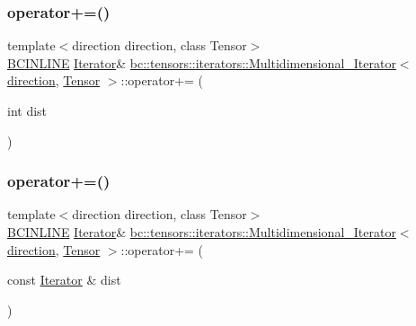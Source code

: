 \subsubsection{\texorpdfstring{operator+=()}{operator+=()}\hspace{0.1cm}{\footnotesize\ttfamily [1/2]}}
{\footnotesize\ttfamily template$<$direction direction, class Tensor$>$ \\
\hyperlink{common_8h_a6699e8b0449da5c0fafb878e59c1d4b1}{B\+C\+I\+N\+L\+I\+NE} \hyperlink{structbc_1_1tensors_1_1iterators_1_1Multidimensional__Iterator_a12d78eb95b3b0fbee7c824f0a79c1513}{Iterator}\& \hyperlink{structbc_1_1tensors_1_1iterators_1_1Multidimensional__Iterator}{bc\+::tensors\+::iterators\+::\+Multidimensional\+\_\+\+Iterator}$<$ \hyperlink{namespacebc_1_1tensors_1_1iterators_ae76efe63fb9cb4985d5e4e6af0ebf296}{direction}, \hyperlink{namespacebc_a659391e47ab612be3ba6c18cf9c89159}{Tensor} $>$\+::operator+= (\begin{DoxyParamCaption}\item[{int}]{dist }\end{DoxyParamCaption})\hspace{0.3cm}{\ttfamily [inline]}}

\mbox{\label{structbc_1_1tensors_1_1iterators_1_1Multidimensional__Iterator_a9962d996f063f390f82b380095d29667}} 
\subsubsection{\texorpdfstring{operator+=()}{operator+=()}\hspace{0.1cm}{\footnotesize\ttfamily [2/2]}}
{\footnotesize\ttfamily template$<$direction direction, class Tensor$>$ \\
\hyperlink{common_8h_a6699e8b0449da5c0fafb878e59c1d4b1}{B\+C\+I\+N\+L\+I\+NE} \hyperlink{structbc_1_1tensors_1_1iterators_1_1Multidimensional__Iterator_a12d78eb95b3b0fbee7c824f0a79c1513}{Iterator}\& \hyperlink{structbc_1_1tensors_1_1iterators_1_1Multidimensional__Iterator}{bc\+::tensors\+::iterators\+::\+Multidimensional\+\_\+\+Iterator}$<$ \hyperlink{namespacebc_1_1tensors_1_1iterators_ae76efe63fb9cb4985d5e4e6af0ebf296}{direction}, \hyperlink{namespacebc_a659391e47ab612be3ba6c18cf9c89159}{Tensor} $>$\+::operator+= (\begin{DoxyParamCaption}\item[{const \hyperlink{structbc_1_1tensors_1_1iterators_1_1Multidimensional__Iterator_a12d78eb95b3b0fbee7c824f0a79c1513}{Iterator} \&}]{dist }\end{DoxyParamCaption})\hspace{0.3cm}{\ttfamily [inline]}}

